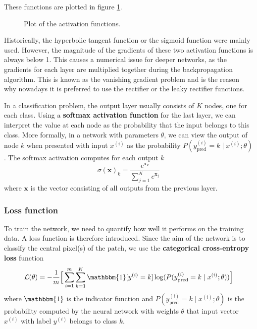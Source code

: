\documentclass[12pt,a4paper,twoside,openright]{report}
\newlength\figureheight
\newlength\figurewidth
\begin{document}
These functions are plotted in figure \ref{fig:activation_functions}. 
\begin{figure}
	\centering 
	\setlength\figureheight{10cm}
	\setlength{}
	
	\caption{Plot of the activation functions.}
	\label{fig:activation_functions}
\end{figure}
Historically, the hyperbolic tangent function or the sigmoid function were mainly used. However, the magnitude of the gradients of these two activation functions is always below 1. This causes a numerical issue for deeper networks, as the gradients for each layer are multiplied together during the backpropagation algorithm. This is known as the vanishing gradient problem \cite{vanishing_gradients} and is the reason why nowadays it is preferred to use the rectifier or the leaky rectifier functions.

In a classification problem, the output layer usually consists of $K$ nodes, one for each class. Using a \textbf{softmax activation function} for the last layer, we can interpret the value at each node as the probability that the input belongs to this class.  More formally, in a network with parameters $\theta$, we can view the output of node $k$ when presented with input $x^{(i)}$ as the probability $P(y_{\text{pred}}^{(i)} = k \mid x^{(i)};\theta)$. The softmax activation computes for each output $k$
\begin{equation}
	\sigma(\mathbf{x})_k = \frac{e^{\mathbf{x}_k}}{\sum_{j=1}^{K}e^{\mathbf{x}_j}}
\end{equation}
where $\mathbf{x}$ is the vector consisting of all outputs from the previous layer.

\subsubsection{Loss function}
To train the network, we need to quantify how well it performs on the training data. A loss function is therefore introduced. Since the aim of the network is to classify the central pixel(s) of the patch, we use the \textbf{categorical cross-entropy loss} function
\begin{equation}
	\label{eq:loss}
	\mathcal{L}(\theta) = 
	- \frac{1}{m}\Big[\sum_{i=1}^m \sum_{k=1}^K\mathbbm{1}[y^{(i)} = k]\log(P(y_{\text{pred}}^{(i)}=k \mid x^{(i)};\theta))\Big]
\end{equation}
where $\mathbbm{1}$ is the indicator function and $P(y_{\text{pred}}^{(i)}=k \mid x^{(i)};\theta)$ is the probability computed by the neural network with weights $\theta$ that input vector $x^{(i)}$ with label $y^{(i)}$ belongs to class $k$.
\end{document}
